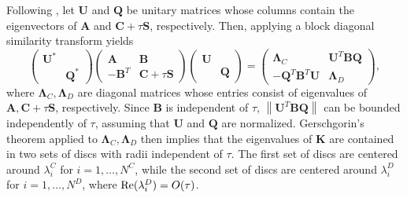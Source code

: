 \documentclass[10pt]{article}
\newcommand{\nor}[1]{\left\| #1 \right\|}
\begin{document}
Following \cite{Warburton20063205}, let $\bm{U}$ and $\bm{Q}$ be unitary matrices whose columns contain the eigenvectors of $\bm{A}$ and $\bm{C} + \tau \bm{S}$, respectively.  Then, applying a block diagonal similarity transform yields
\[
\left(\begin{array}{cc}
\bm{U}^* & \\
& \bm{Q}^*
\end{array}\right)
\left(\begin{array}{cc}
\bm{A} & \bm{B}\\
-\bm{B}^T & \bm{C} + \tau \bm{S}
\end{array}\right)
\left(\begin{array}{cc}
\bm{U} & \\
& \bm{Q}
\end{array}\right)
 = \left(\begin{array}{cc}
\bm{\Lambda}_C & \bm{U}^T\bm{B}\bm{Q}\\
-\bm{Q}^T\bm{B}^T\bm{U} & \bm{\Lambda}_D
\end{array}\right),
\]
where $\bm{\Lambda}_C,\bm{\Lambda}_D$ are diagonal matrices whose entries consist of eigenvalues of $\bm{A},\bm{C} + \tau\bm{S}$, respectively.  Since $\bm{B}$ is independent of $\tau$, $\nor{\bm{U}^T\bm{B}\bm{Q}}$ can be bounded independently of $\tau$, assuming that $\bm{U}$ and $\bm{Q}$ are normalized.  Gerschgorin's theorem applied to $\bm{\Lambda}_C,\bm{\Lambda}_D$ then implies that the eigenvalues of $\bm{K}$ are contained in two sets of discs with radii independent of $\tau$.  The first set of discs are centered around $\lambda^C_i$ for $i = 1,\ldots,N^C$, while the second set of discs are centered around $\lambda^D_i$ for $i = 1,\ldots,N^D$, where ${\rm Re}(\lambda^D_i) = O(\tau)$. 
\end{document}
